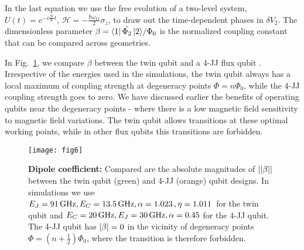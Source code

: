 \noindent  In  the  last   equation  we  use  the  free  evolution   of  a  two-level  system,
$                   U(t)=e^{-i                    \frac{\mathcal{H}}{\hbar}t}                   $,
$  \mathcal{H}  =   -\frac{\hbar\omega_{21}}{2}\sigma_z  $,  to  draw  out  the   time-dependent  phases  in
$\delta  V_2$.   The  dimensionless  parameter  $\beta =  {\Bra{1}\hat{\Phi_2}\Ket{2}}/{\Phi_0}  $  is  the
normalized coupling constant that can be compared across geometries.

In  Fig.~\ref{fig:fig5},  we  compare $\beta$  between  the  twin  qubit  and a  4-JJ  flux  qubit
\cite{honigl2018} .   Irrespective of  the energies  used in the  simulations, the  twin qubit
always has a  local maximum of coupling strength  at degeneracy points $ \Phi =  n\Phi_0$, while the
4-JJ coupling  strength goes  to zero.  We  have discussed earlier  the benefits  of operating
qubits  near the  degeneracy points  - where  there  is a  low magnetic  field sensitivity  to
magnetic field variations.  The twin qubit  allows \ilra {} transitions at these
optimal working points, while in other flux qubits this transitions are forbidden.

\begin{figure}[h]
  \centering \texttt{[image: fig6]}
  \caption{\small \textbf{Dipole  coefficient:} Compared are the absolute magnitudes of $\left|\left|\beta\right|\right|$
    between the twin qubit (green) and 4-JJ (orange) qubit designs. In simulations we use $ E_J =  91\,\text{GHz}, E_C  = 13.5\,\text{GHz}, \alpha  = 1.023\,\text{},  \eta =1.011\,\text{} $ for the twin qubit and
    $ E_{C} = 20\,\text{GHz}, E_J=30\,\text{GHz}, \alpha=0.45 $ for the 4-JJ qubit. The 4-JJ qubit has $\left|\beta\right| = 0$ in the vicinity of degeneracy points $  \Phi =  (n+\frac{1}{2})\Phi_0$, where the transition  \ilra {} is therefore  forbidden.
    \label{fig:fig5}}
\end{figure}


 
